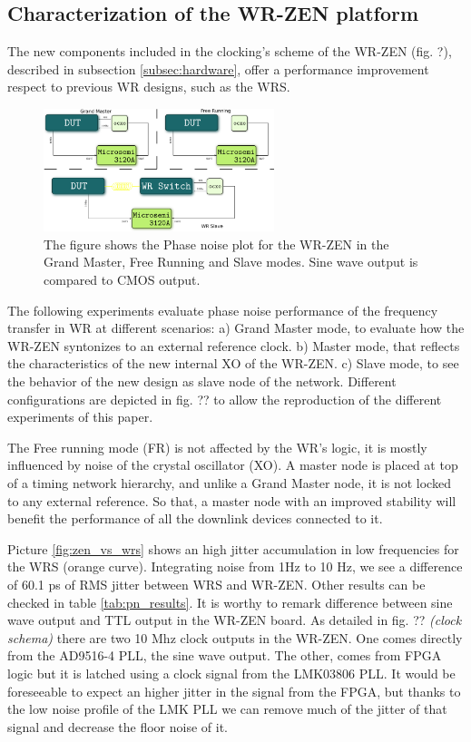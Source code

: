 \subsection{Characterization of the WR-ZEN platform}
\label{subsec: charact_zen}


The new components included in the clocking's scheme of the WR-ZEN (fig. ?), described in subsection \ref{subsec:hardware}, offer a performance improvement respect to previous WR designs, such as the WRS. 

\begin{figure}
    \centering
    \includegraphics[width=0.6\textwidth]{img/pn_setup.png}
    \caption{The figure shows the Phase noise plot for the WR-ZEN in the Grand Master, Free Running and Slave modes. Sine wave output is compared to CMOS output.}
    \label{fig:pn_setup}
\end{figure}

The following experiments evaluate phase noise performance of the frequency transfer in WR at different scenarios: a) Grand Master mode, to evaluate how the WR-ZEN syntonizes to an external reference clock. b) Master mode, that reflects the characteristics of the new internal XO of the WR-ZEN. c) Slave mode, to see the behavior of the new design as slave node of the network. Different configurations are depicted in fig. ?? to allow the reproduction of the different experiments of this paper.

The Free running mode (FR) is not affected by the WR's logic, it is mostly influenced by noise of the crystal oscillator (XO). A master node is placed at top of a timing network hierarchy, and unlike a Grand Master node, it is not locked to any external reference. So that, a master node with an improved stability will benefit the performance of all the downlink devices connected to it.

Picture \ref{fig:zen_vs_wrs} shows an high jitter accumulation in low frequencies for the WRS (orange curve). Integrating noise from 1Hz to 10 Hz, we see a difference of 60.1 ps of RMS jitter between WRS and WR-ZEN. Other results can be checked in table \ref{tab:pn_results}. It is worthy to remark difference between sine wave output and TTL output in the WR-ZEN board. As detailed in fig. ?? \textit{(clock schema)} there are two 10 Mhz clock outputs in the WR-ZEN. One comes directly from the AD9516-4 PLL, the sine wave output. The other, comes from FPGA logic but it is latched using a clock signal from the LMK03806 PLL. It would be foreseeable to expect an higher jitter in the signal from the FPGA, but thanks to the low noise profile of the LMK PLL we can remove much of the jitter of that signal and decrease the floor noise of it.


